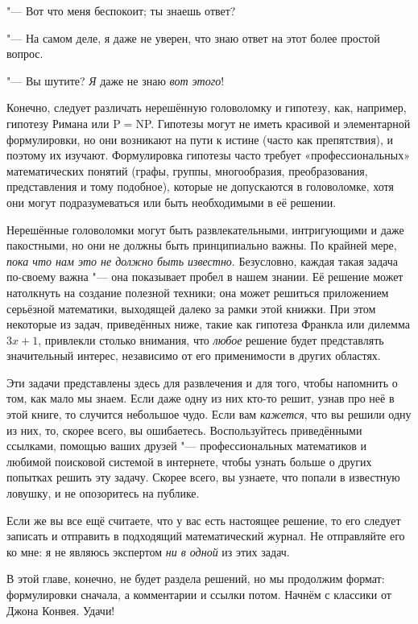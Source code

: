\documentclass[twoside]{book}
\begin{document}
"--- Вот что меня беспокоит; ты знаешь ответ?

"--- На самом деле, я даже не уверен, что знаю ответ на этот более простой вопрос.

"--- Вы шутите? \emph{Я} даже не знаю \emph{вот этого}!

Конечно, следует различать нерешённую головоломку и гипотезу, как, например, гипотезу Римана или P${}={}$NP.
Гипотезы могут не иметь красивой и элементарной формулировки, но они возникают на пути к истине (часто как препятствия), и поэтому их изучают.
Формулировка гипотезы часто требует «профессиональных» математических понятий (графы, группы, многообразия, преобразования, представления и тому подобное), которые не допускаются в головоломке, хотя они могут подразумеваться или быть необходимыми в её решении.

Нерешённые головоломки могут быть развлекательными, интригующими и даже пакостными,
но они не должны быть принципиально важны. 
По крайней мере, \emph{пока что нам это не должно быть известно}.
Безусловно, каждая такая задача по-своему важна "--- она показывает пробел в нашем знании.
Её решение может натолкнуть на создание полезной техники;
она может решиться приложением серьёзной математики, выходящей далеко за рамки этой книжки.
При этом некоторые из задач, приведённых ниже, такие как гипотеза Франкла или дилемма $3x+1$, привлекли столько внимания, что \emph{любое} решение будет представлять значительный интерес, независимо от его применимости в других областях.

Эти задачи представлены здесь для развлечения и для того, чтобы напомнить о том, как мало мы знаем.
Если даже одну из них кто-то решит, узнав про неё в этой книге, то случится небольшое чудо.
Если вам \emph{кажется}, что вы решили одну из них, то, скорее всего, вы ошибаетесь.
Воспользуйтесь приведёнными ссылками, помощью ваших друзей "--- профессиональных математиков и любимой поисковой системой в интернете, чтобы узнать больше о других попытках решить эту задачу.
Скорее всего, вы узнаете, что попали в известную ловушку, и не опозоритесь на публике.

Если же вы все ещё считаете, что у вас есть настоящее решение, то его следует записать и отправить в подходящий математический журнал.
Не отправляйте его ко мне: я не являюсь экспертом \emph{ни в одной} из этих задач.

\medskip

В этой главе, конечно, не будет раздела решений, но мы продолжим формат: формулировки сначала, а комментарии и ссылки потом.
Начнём с классики от Джона Конвея.
Удачи!
\end{document}
